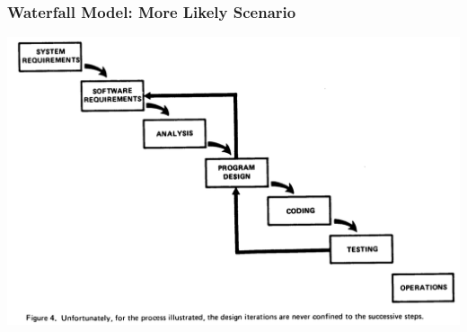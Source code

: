 \begin{frame}
\frametitle{Waterfall Model: More Likely Scenario}

\begin{center}
\includegraphics[height=.7\textheight]{images/less-ideal-iteration}
\end{center}

\end{frame}

